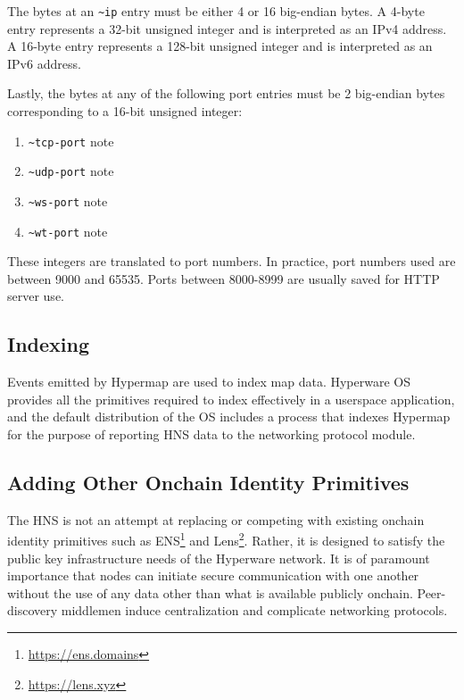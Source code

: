 \documentclass[runningheads]{llncs}
\begin{document}
The bytes at an \verb|~ip| entry must be either 4 or 16 big-endian bytes.
A 4-byte entry represents a 32-bit unsigned integer and is interpreted as an IPv4 address.
A 16-byte entry represents a 128-bit unsigned integer and is interpreted as an IPv6 address.

Lastly, the bytes at any of the following port entries must be 2 big-endian bytes corresponding to a 16-bit unsigned integer:

\begin{enumerate}
	\item \verb|~tcp-port| note
	\item \verb|~udp-port| note
	\item \verb|~ws-port| note
	\item \verb|~wt-port| note
\end{enumerate}

These integers are translated to port numbers.
In practice, port numbers used are between 9000 and 65535.
Ports between 8000-8999 are usually saved for HTTP server use.

\subsection{Indexing}
\label{sec:hnsindexing}

Events emitted by Hypermap are used to index map data.
Hyperware OS provides all the primitives required to index effectively in a userspace application, and the default distribution of the OS includes a process that indexes Hypermap for the purpose of reporting HNS data to the networking protocol module.

\subsection{Adding Other Onchain Identity Primitives}
\label{sec:hnsotherprimitives}

The HNS is not an attempt at replacing or competing with existing onchain identity primitives such as ENS\footnote{\url{https://ens.domains}} and Lens\footnote{\url{https://lens.xyz}}.
Rather, it is designed to satisfy the public key infrastructure needs of the Hyperware network.
It is of paramount importance that nodes can initiate secure communication with one another without the use of any data other than what is available publicly onchain.
Peer-discovery middlemen induce centralization and complicate networking protocols.
\end{document}
